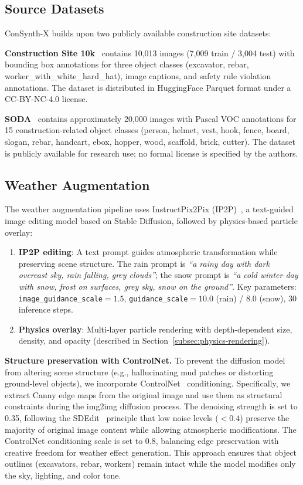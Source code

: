 \documentclass[12pt]{article}
\begin{document}
\subsection{Source Datasets}

ConSynth-X builds upon two publicly available construction site datasets:

\textbf{Construction Site 10k}~\citep{chen2025vlm} contains 10,013 images (7,009 train / 3,004 test) with bounding box annotations for three object classes (excavator, rebar, worker\_with\_white\_hard\_hat), image captions, and safety rule violation annotations. The dataset is distributed in HuggingFace Parquet format under a CC-BY-NC-4.0 license.

\textbf{SODA}~\citep{duan2022soda} contains approximately 20,000 images with Pascal VOC annotations for 15 construction-related object classes (person, helmet, vest, hook, fence, board, slogan, rebar, handcart, ebox, hopper, wood, scaffold, brick, cutter). The dataset is publicly available for research use; no formal license is specified by the authors.

\subsection{Weather Augmentation}

The weather augmentation pipeline uses InstructPix2Pix (IP2P)~\citep{brooks2023ip2p}, a text-guided image editing model based on Stable Diffusion, followed by physics-based particle overlay:

\begin{enumerate}[noitemsep]
    \item \textbf{IP2P editing}: A text prompt guides atmospheric transformation while preserving scene structure. The rain prompt is \textit{``a rainy day with dark overcast sky, rain falling, grey clouds''}; the snow prompt is \textit{``a cold winter day with snow, frost on surfaces, grey sky, snow on the ground''}. Key parameters: \texttt{image\_guidance\_scale}$=1.5$, \texttt{guidance\_scale}$=10.0$ (rain) / $8.0$ (snow), 30 inference steps.
    \item \textbf{Physics overlay}: Multi-layer particle rendering with depth-dependent size, density, and opacity (described in Section~\ref{subsec:physics-rendering}).
\end{enumerate}

\textbf{Structure preservation with ControlNet.} To prevent the diffusion model from altering scene structure (e.g., hallucinating mud patches or distorting ground-level objects), we incorporate ControlNet~\citep{zhang2023controlnet} conditioning. Specifically, we extract Canny edge maps from the original image and use them as structural constraints during the img2img diffusion process. The denoising strength is set to 0.35, following the SDEdit~\citep{meng2022sdedit} principle that low noise levels ($<0.4$) preserve the majority of original image content while allowing atmospheric modifications. The ControlNet conditioning scale is set to 0.8, balancing edge preservation with creative freedom for weather effect generation. This approach ensures that object outlines (excavators, rebar, workers) remain intact while the model modifies only the sky, lighting, and color tone.
\end{document}
